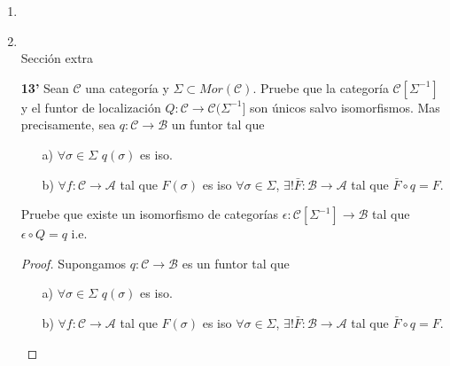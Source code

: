 \documentclass{article}
\begin{document}
\begin{enumerate}
\begin{proof}
Por lo que $(\mathscr{D},T|_\mathscr{D},\triangle|_\mathscr{D})^{op}$ es subcategoría triangulada de $(\mathscr{C},T,\triangle)^{op}$.

\end{proof}
\item
\item 
\,\\

Sección extra

\textbf{13'} Sean $\mathscr{C}$ una categoría y $\Sigma\subset Mor(\mathscr{C})$. Pruebe que la categoría $\mathscr{C}[\Sigma^{-1}]$ y el 
funtor de localización $Q:\mathscr{C}\rightarrow \mathscr{C}(\Sigma^{-1}]$ son únicos salvo isomorfismos. Mas precisamente, sea $q:\mathscr{C}
\rightarrow \mathscr{B}$ un funtor tal que 
\begin{itemize}
\item[a)] $\forall \sigma\in \Sigma$ \quad $q(\sigma)$ es iso.
\item[b)] $\forall f:\mathscr{C}\to \mathscr{A}$ tal que $F(\sigma)$ es iso $\forall \sigma\in \Sigma$, $\exists ! \bar{F}:\mathscr{B}\to\mathscr{A}$
tal que $\bar{F}\circ q=F$.\\
\end{itemize}
Pruebe que existe un isomorfismo de categorías $\epsilon:\mathscr{C}[\Sigma^{-1}]\to \mathscr{B}$ tal que \\$\epsilon\circ Q=q$ \quad i.e. \\
\centerline{
}
\begin{proof}
Supongamos $q:\mathscr{C}\to \mathscr{B}$ es un funtor tal que 
\begin{itemize}
\item[a)] $\forall \sigma\in \Sigma$ \quad $q(\sigma)$ es iso.
\item[b)] $\forall f:\mathscr{C}\to \mathscr{A}$ tal que $F(\sigma)$ es iso $\forall \sigma\in \Sigma$, $\exists ! \bar{F}:\mathscr{B}\to\mathscr{A}$
tal que $\bar{F}\circ q=F$.\\
\end{itemize}


\end{proof}
\end{enumerate}
\end{document}
